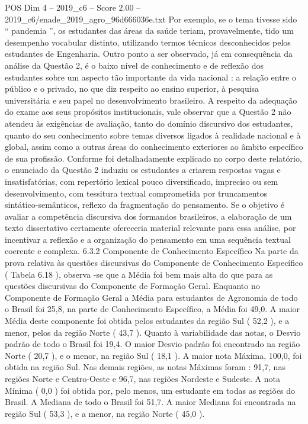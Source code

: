 \begin{textsample}{POS Dim 4 – 2019\_c6 – Score 2.00 – 2019\_c6/enade\_2019\_agro\_96d666036e.txt}
Por exemplo, se o tema tivesse sido “ pandemia ”, os estudantes das áreas da saúde teriam, provavelmente, tido um desempenho vocabular distinto, utilizando termos técnicos desconhecidos pelos estudantes de Engenharia.
Outro ponto a ser observado, já em consequência da análise da Questão 2, é o baixo nível de conhecimento e de reflexão dos estudantes sobre um aspecto tão importante da vida nacional : a relação entre o público e o privado, no que diz respeito ao ensino superior, à pesquisa universitária e seu papel no desenvolvimento brasileiro.
A respeito da adequação do exame aos seus propósitos institucionais, vale observar que a Questão 2 não atendeu às exigências de avaliação, tanto do domínio discursivo dos estudantes, quanto do seu conhecimento sobre temas diversos ligados à realidade nacional e à global, assim como a outras áreas do conhecimento exteriores ao âmbito específico de sua profissão.
Conforme foi detalhadamente explicado no corpo deste relatório, o enunciado da Questão 2 induziu os estudantes a criarem respostas vagas e insatisfatórias, com repertório lexical pouco diversificado, impreciso ou sem desenvolvimento, com tessitura textual comprometida por truncamentos sintático-semânticos, reflexo da fragmentação do pensamento.
Se o objetivo é avaliar a competência discursiva dos formandos brasileiros, a elaboração de um texto dissertativo certamente ofereceria material relevante para essa análise, por incentivar a reflexão e a organização do pensamento em uma sequência textual coerente e complexa. 6.3.2 Componente de Conhecimento Específico Na parte da prova relativa às questões discursivas do Componente de Conhecimento Específico ( Tabela 6.18 ), observa -se que a Média foi bem mais alta do que para as questões discursivas do Componente de Formação Geral.
Enquanto no Componente de Formação Geral a Média para estudantes de Agronomia de todo o Brasil foi 25,8, na parte de Conhecimento Específico, a Média foi 49,0.
A maior Média deste componente foi obtida pelos estudantes da região Sul ( 52,2 ), e a menor, pelos da região Norte ( 43,7 ).
Quanto à variabilidade das notas, o Desvio padrão de todo o Brasil foi 19,4.
O maior Desvio padrão foi encontrado na região Norte ( 20,7 ), e o menor, na região Sul ( 18,1 ).
A maior nota Máxima, 100,0, foi obtida na região Sul.
Nas demais regiões, as notas Máximas foram : 91,7, nas regiões Norte e Centro-Oeste e 96,7, nas regiões Nordeste e Sudeste.
A nota Mínima ( 0,0 ) foi obtida por, pelo menos, um estudante em todas as regiões do Brasil.
A Mediana de todo o Brasil foi 51,7.
A maior Mediana foi encontrada na região Sul ( 53,3 ), e a menor, na região Norte ( 45,0 ).

\end{textsample}
